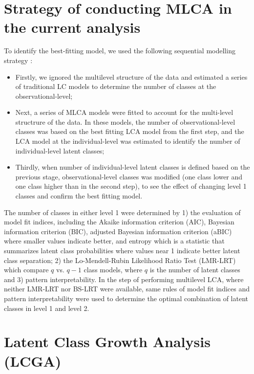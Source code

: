 \section{Strategy of conducting MLCA in the current analysis}\vspace{-0.3cm}

To identify the best-fitting model, we used the following sequential modelling strategy \parencite{henry2010multilevel}: 

\begin{itemize}
	\item Firstly, we ignored the multilevel structure of the data and estimated a series of traditional LC models to determine the number of classes at the observational-level;
	\item Next, a series of MLCA models were fitted to account for the multi-level structrure of the data. In these models, the number of observational-level classes was based on the best fitting LCA model from the first step, and the LCA model at the individual-level was estimated to identify the number of individual-level latent classes;
	\item Thirdly, when number of individual-level latent classes is defined based on the previous stage, observational-level classes was modified (one class lower and one class higher than in the second step), to see the effect of changing level 1 classes and confirm the best fitting model.
\end{itemize}

The number of classes in either level 1 were determined by 1) the evaluation of model fit indices, including the Akaike information criterion (AIC), Bayesian information criterion (BIC), adjusted Bayesian information criterion (aBIC) where smaller values indicate better, and entropy which is a statistic that summarizes latent class probabilities where values near 1 indicate better latent class separation; 2) the Lo-Mendell-Rubin Likelihood Ratio Test (LMR-LRT) \parencite{lo2001testing, nylund2007deciding} which compare $q$ vs. $q-1$ class models, where $q$ is the number of latent classes and 3) pattern interpretability. In the step of performing multilevel LCA, where neither LMR-LRT nor BS-LRT were available, same rules of model fit indices and pattern interpretability were used to determine the optimal combination of latent classes in level 1 and level 2. 

\section{Latent Class Growth Analysis (LCGA)}

